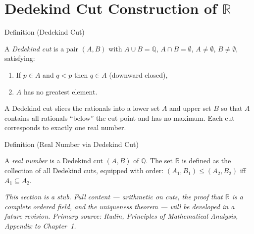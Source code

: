 
\section{\texorpdfstring{Dedekind Cut Construction of $\mathbb{R}$}{Dedekind Cut Construction of R}}

\begin{definitionbox}{Definition (Dedekind Cut)}
\begin{definition}\label{def:dedekind-cut}
A \emph{Dedekind cut} is a pair $(A, B)$ with $A \cup B = \mathbb{Q}$,
$A \cap B = \emptyset$, $A \neq \emptyset$, $B \neq \emptyset$, satisfying:
\begin{enumerate}
  \item If $p \in A$ and $q < p$ then $q \in A$ \quad (downward closed),
  \item $A$ has no greatest element.
\end{enumerate}
\end{definition}
\end{definitionbox}

\begin{remark*}
A Dedekind cut slices the rationals into a lower set $A$ and upper set $B$
so that $A$ contains all rationals ``below'' the cut point and has no maximum.
Each cut corresponds to exactly one real number.
\end{remark*}

\begin{definitionbox}{Definition (Real Number via Dedekind Cut)}
\begin{definition}\label{def:real-as-cut}
A \emph{real number} is a Dedekind cut $(A, B)$ of $\mathbb{Q}$.
The set $\mathbb{R}$ is defined as the collection of all Dedekind cuts,
equipped with order: $(A_1, B_1) \leq (A_2, B_2)$ iff $A_1 \subseteq A_2$.
\end{definition}
\end{definitionbox}

\begin{remark*}[Status]
\textit{This section is a stub. Full content --- arithmetic on cuts, the proof
that $\mathbb{R}$ is a complete ordered field, and the uniqueness theorem ---
will be developed in a future revision. Primary source: Rudin,
\textit{Principles of Mathematical Analysis}, Appendix to Chapter~1.}
\end{remark*}

